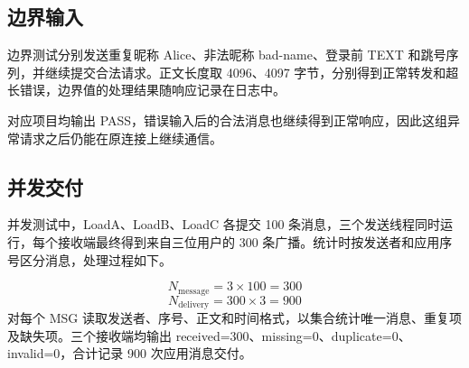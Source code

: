 \documentclass[UTF8,a4paper,10pt,fontset=fandol]{ctexart}
\begin{document}
\subsection{边界输入}
边界测试分别发送重复昵称 Alice、非法昵称 bad-name、登录前 TEXT 和跳号序列，并继续提交合法请求。正文长度取 4096、4097 字节，分别得到正常转发和超长错误，边界值的处理结果随响应记录在日志中。

对应项目均输出 PASS，错误输入后的合法消息也继续得到正常响应，因此这组异常请求之后仍能在原连接上继续通信。

\subsection{并发交付}
并发测试中，LoadA、LoadB、LoadC 各提交 100 条消息，三个发送线程同时运行，每个接收端最终得到来自三位用户的 300 条广播。统计时按发送者和应用序号区分消息，处理过程如下。

\[
N_{\mathrm{message}}=3\times100=300
\]
\[
N_{\mathrm{delivery}}=300\times3=900
\]
对每个 MSG 读取发送者、序号、正文和时间格式，以集合统计唯一消息、重复项及缺失项。三个接收端均输出 received=300、missing=0、duplicate=0、invalid=0，合计记录 900 次应用消息交付。

\medskip
{}
\medskip
{}
\medskip
\end{document}
